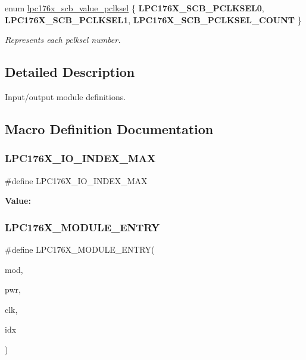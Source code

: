 \begin{DoxyCompactItemize}
enum \mbox{\hyperlink{io-defs_8h_acd0dc32b7d4201190606b67e031151dd}{lpc176x\+\_\+scb\+\_\+value\+\_\+pclksel}} \{ {\bfseries L\+P\+C176\+X\+\_\+\+S\+C\+B\+\_\+\+P\+C\+L\+K\+S\+E\+L0}, 
{\bfseries L\+P\+C176\+X\+\_\+\+S\+C\+B\+\_\+\+P\+C\+L\+K\+S\+E\+L1}, 
{\bfseries L\+P\+C176\+X\+\_\+\+S\+C\+B\+\_\+\+P\+C\+L\+K\+S\+E\+L\+\_\+\+C\+O\+U\+NT}
 \}
\begin{DoxyCompactList}\small\item\em Represents each pclksel number. \end{DoxyCompactList}\end{DoxyCompactItemize}


\subsection{Detailed Description}
Input/output module definitions. 



\subsection{Macro Definition Documentation}
\mbox{\label{io-defs_8h_aebff7ecc4822b014b5abb13468be8c28}} 
\subsubsection{\texorpdfstring{LPC176X\_IO\_INDEX\_MAX}{LPC176X\_IO\_INDEX\_MAX}}
{\footnotesize\ttfamily \#define L\+P\+C176\+X\+\_\+\+I\+O\+\_\+\+I\+N\+D\+E\+X\+\_\+\+M\+AX}

{\bfseries Value\+:}
\begin{DoxyCode}{0}

\end{DoxyCode}
\mbox{\label{io-defs_8h_a7947340f8bb99e4ae994cf39d385e0e1}} 
\subsubsection{\texorpdfstring{LPC176X\_MODULE\_ENTRY}{LPC176X\_MODULE\_ENTRY}}
{\footnotesize\ttfamily \#define L\+P\+C176\+X\+\_\+\+M\+O\+D\+U\+L\+E\+\_\+\+E\+N\+T\+RY(\begin{DoxyParamCaption}\item[{}]{mod,  }\item[{}]{pwr,  }\item[{}]{clk,  }\item[{}]{idx }\end{DoxyParamCaption})}

